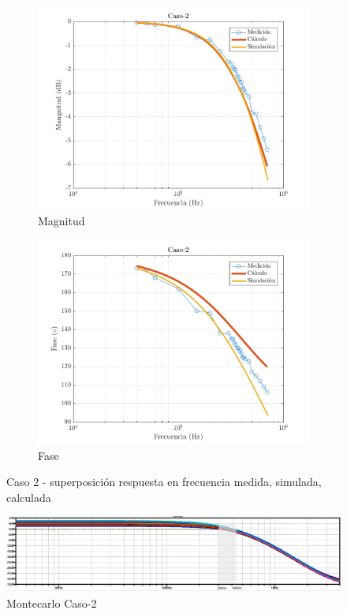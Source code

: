 \documentclass[../../main.tex]{subfiles}
\begin{document}
\begin{figure}[H]
\centering
\begin{subfigure}[http]{0.49\textwidth}
\includegraphics[width=\textwidth]{imagenes/Caso-2_mag_inv.png}
\caption{Magnitud}\label{fig=magInvC2}
\end{subfigure}
\begin{subfigure}[http]{0.49\textwidth}
\includegraphics[width=\textwidth]{imagenes/Caso-2_fase_inv.png}
\caption{Fase}
\end{subfigure}
\caption{Caso 2 - superposición respuesta en  frecuencia medida, simulada, calculada}
\end{figure}

\begin{figure}[H]
\centering
\includegraphics[width=1\textwidth]{imagenes/montecarlo_inv_c2.png}
\caption{Montecarlo Caso-2} \label{fig=mcInvC2}
\end{figure}
\end{document}
